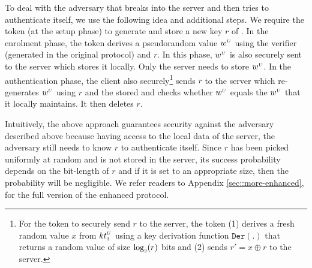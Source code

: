 To deal with the adversary that breaks into the server and then tries to authenticate itself, we use the following idea and additional steps. We require the token (at the setup phase) to generate and store a new key $r$ of \prf.  In the enrolment phase, the token derives a pseudorandom value $w^{\scriptscriptstyle U}$ using the verifier \VC{\verifier} (generated in the original protocol) and $r$. In this phase, $w^{\scriptscriptstyle U}$ is also securely sent to the server which stores it locally. Only the server needs to store $w^{\scriptscriptstyle U}$.  
%
In the authentication phase, the client also securely\footnote{For the token to securely send $r$ to the server, the token (1) derives a fresh random value $x$ from ${kt}_{\scriptscriptstyle 3}^{\scriptscriptstyle U}$ using a key derivation function $\mathtt{Der}(.)$ that returns a random value of size $\log_{\scriptscriptstyle 2}(r)$ bits and  (2) sends $r'=x\oplus r$ to the server.} sends $r$ to the server which re-generates  $w^{\scriptscriptstyle U}$ using $r$ and the stored \VC{\verifier} and checks whether $w^{\scriptscriptstyle U}$ equals the $w^{\scriptscriptstyle U}$ that it locally maintains. It then deletes $r$. 

Intuitively, the above approach guarantees security against the adversary described above because having access to the local data of the server, the adversary still needs to know $r$ to authenticate itself. Since $r$ has been picked uniformly at random and is not stored in the server, its success probability depends on the bit-length of $r$ and if it is set to an appropriate size, then the probability will be negligible. 
%
We refer readers to  Appendix \ref{sec::more-enhanced}, for the full version of the enhanced protocol. 



